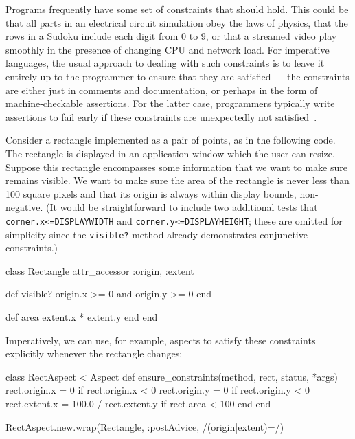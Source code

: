 
Programs frequently have some set of constraints that should hold.
This could be that all parts in an electrical circuit simulation obey
the laws of physics, that the rows in a Sudoku include each digit from
0 to 9, or that a streamed video play smoothly in the presence of
changing CPU and network load. For imperative languages, the usual
approach to dealing with such constraints is to leave it entirely up
to the programmer to ensure that they are satisfied --- the
constraints are either just in comments and documentation, or perhaps
in the form of machine-checkable assertions.  For the latter case,
programmers typically write assertions to fail early if these
constraints are unexpectedly not satisfied~\cite{rinard2005exploring}.

Consider a rectangle implemented as a pair of points, as in the
following code.  The rectangle is displayed in an application window
which the user can resize.  Suppose this rectangle encompasses some
information that we want to make sure remains visible. We want to make
sure the area of the rectangle is never less than 100 square pixels
and that its origin is always within display bounds,
\ie non-negative.  (It would be straightforward to include two
additional tests that \lstinline{corner.x<=DISPLAYWIDTH} and
\lstinline{corner.y<=DISPLAYHEIGHT}; these are omitted for simplicity
since the \lstinline{visible?} method already demonstrates conjunctive
constraints.)

\begin{code}
class Rectangle
  attr_accessor :origin, :extent

  def visible?
    origin.x >= 0 and origin.y >= 0
  end

  def area
    extent.x * extent.y
  end
end
\end{code}


Imperatively, we can use, for example, aspects to satisfy these
constraints explicitly whenever the rectangle changes:
\begin{code}
class RectAspect < Aspect
  def ensure_constraints(method, rect, status, *args)
    rect.origin.x = 0 if rect.origin.x < 0
    rect.origin.y = 0 if rect.origin.y < 0
    rect.extent.x = 100.0 / rect.extent.y if rect.area < 100
  end
end

RectAspect.new.wrap(Rectangle, :postAdvice, /(origin|extent)=/)
\end{code}

